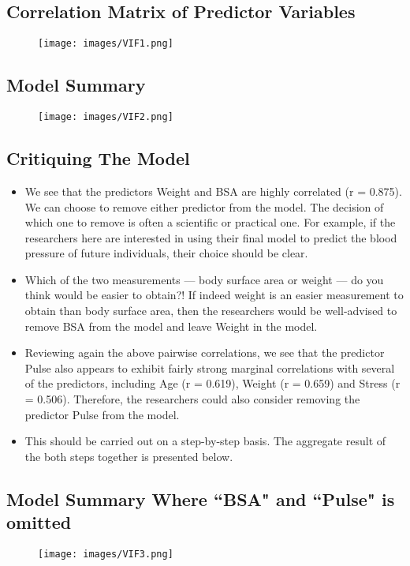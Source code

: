 \documentclass[a4paper,12pt]{article}
\begin{document}
\subsection*{Correlation Matrix of Predictor Variables}
\begin{figure}[h!]
\centering
\texttt{[image: images/VIF1.png]}
\end{figure}
\subsection*{Model Summary}
\begin{figure}[h!]
\centering
\texttt{[image: images/VIF2.png]}
\end{figure}

\subsection*{Critiquing The Model}
\begin{itemize}
    \item We see that the predictors Weight and BSA are highly correlated (r = 0.875). We can choose to remove either predictor from the model. The decision of which one to remove is often a scientific or practical one. For example, if the researchers here are interested in using their final model to predict the blood pressure of future individuals, their choice should be clear. 
    \item Which of the two measurements — body surface area or weight — do you think would be easier to obtain?! If indeed weight is an easier measurement to obtain than body surface area, then the researchers would be well-advised to remove BSA from the model and leave Weight in the model.

\item Reviewing again the above pairwise correlations, we see that the predictor Pulse also appears to exhibit fairly strong marginal correlations with several of the predictors, including Age (r = 0.619), Weight (r = 0.659) and Stress (r = 0.506). Therefore, the researchers could also consider removing the predictor Pulse from the model.
\item This should be carried out on a step-by-step basis. The aggregate result of the both steps together is presented below.
\end{itemize}

\newpage

\subsection*{Model Summary Where ``BSA" and ``Pulse" is omitted}

\begin{figure}[h!]
\centering
\texttt{[image: images/VIF3.png]}
\end{figure}
\end{document}
